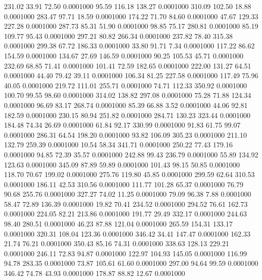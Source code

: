  231.02   33.91   72.50   0.0001000
  95.59  116.18  138.27   0.0001000
 310.09  102.50   18.88   0.0001000
 283.47   97.71   18.59   0.0001000
 174.22   71.70   84.60   0.0001000
  47.67  129.33  227.28   0.0001000
 287.73   85.31   51.90   0.0001000
  98.85   75.17  280.81   0.0001000
  85.19  109.77   95.43   0.0001000
 297.21   80.82  266.34   0.0001000
 237.82   78.40  315.38   0.0001000
 299.38   67.72  186.33   0.0001000
  33.80   91.71    7.34   0.0001000
 117.22   86.62  154.59   0.0001000
 134.67   27.69  146.59   0.0001000
  90.25  105.53   45.71   0.0001000
 232.69   68.85   71.41   0.0001000
 101.41   72.59  182.65   0.0001000
 222.00  131.27   64.51   0.0001000
  44.40   79.42   39.11   0.0001000
 106.34   81.25  227.58   0.0001000
 117.49   75.96   40.05   0.0001000
 219.72  111.01  255.71   0.0001000
  74.71  112.33  350.92   0.0001000
 100.70   99.55   98.60   0.0001000
 314.02  138.82  297.08   0.0001000
  75.28   71.88  124.34   0.0001000
  96.69   83.17  268.74   0.0001000
  85.39   66.88    3.52   0.0001000
  44.06   92.81  182.59   0.0001000
 230.15   80.94  251.82   0.0001000
 284.71  130.23  323.44   0.0001000
 184.48   74.34   26.69   0.0001000
  61.84   92.17  330.99   0.0001000
  91.83   61.75   99.07   0.0001000
 286.31   64.54  198.20   0.0001000
  93.82  106.09  305.23   0.0001000
 211.10  132.79  259.39   0.0001000
  10.54   58.34  341.71   0.0001000
 250.22   77.43  179.16   0.0001000
  94.85   72.39   35.57   0.0001000
 242.88   99.43  236.79   0.0001000
  55.89  134.92  123.63   0.0001000
 345.09   87.89   59.89   0.0001000
 101.43   98.15   50.85   0.0001000
 118.70   70.67  199.02   0.0001000
 275.76  119.80   45.85   0.0001000
 299.59   62.64  310.53   0.0001000
 186.11   42.53  310.56   0.0001000
 111.77  101.28   65.37   0.0001000
  76.79   90.68  255.76   0.0001000
 327.27   74.02   11.25   0.0001000
  79.09   96.38    7.88   0.0001000
  58.47   72.89  136.39   0.0001000
  19.82   70.41  234.52   0.0001000
 294.52   76.61  162.73   0.0001000
 224.05   82.21  213.86   0.0001000
 191.77   29.49  332.17   0.0001000
 244.63   98.40  280.51   0.0001000
  46.23   87.88  121.04   0.0001000
 265.59  154.31  133.17   0.0001000
 320.31  108.04  123.36   0.0001000
 346.42   34.41  147.47   0.0001000
 162.33   21.74   76.21   0.0001000
 350.43   85.16   74.31   0.0001000
 338.63  128.13  229.21   0.0001000
 246.11   72.83   94.87   0.0001000
 122.97  104.93  145.05   0.0001000
 116.99   94.78  283.35   0.0001000
  73.87  105.61   61.60   0.0001000
 297.00   94.64   99.59   0.0001000
 346.42   74.78   43.93   0.0001000
 178.87   88.82   12.67   0.0001000

